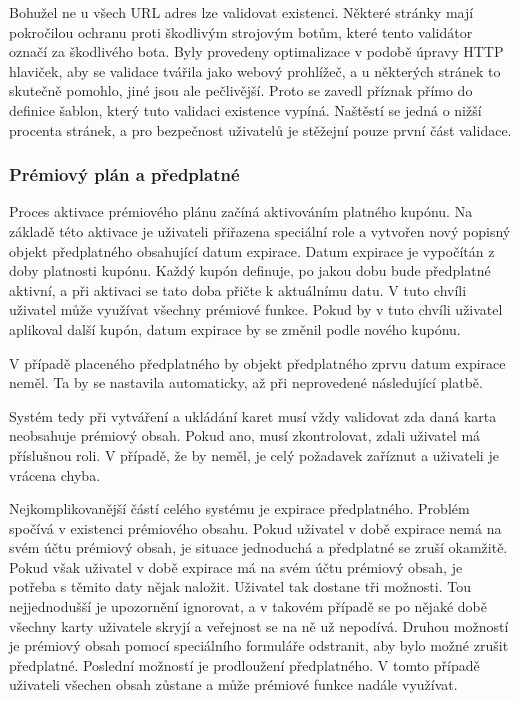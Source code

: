 
			Bohužel ne u všech \ac{URL} adres lze validovat existenci.
			Některé stránky mají pokročilou ochranu proti škodlivým strojovým botům, které tento validátor označí za
			škodlivého bota.
			Byly provedeny optimalizace v podobě úpravy \ac{HTTP} hlaviček, aby se validace tvářila jako webový prohlížeč,
			a u některých stránek to skutečně pomohlo, jiné jsou ale pečlivější.
			Proto se zavedl příznak přímo do definice šablon, který tuto validaci existence vypíná.
			Naštěstí se jedná o nižší procenta stránek, a pro bezpečnost uživatelů je stěžejní pouze první část validace.

		\subsubsection{Prémiový plán a předplatné}

		Proces aktivace prémiového plánu začíná aktivováním platného kupónu.
		Na základě této aktivace je uživateli přiřazena speciální role a vytvořen nový popisný objekt předplatného
		obsahující datum expirace.
		Datum expirace je vypočítán z doby platnosti kupónu.
		Každý kupón definuje, po jakou dobu bude předplatné aktivní, a při aktivaci se tato doba přičte k aktuálnímu datu.
		V tuto chvíli uživatel může využívat všechny prémiové funkce.
		Pokud by v tuto chvíli uživatel aplikoval další kupón, datum expirace by se změnil podle nového kupónu.

		V případě placeného předplatného by objekt předplatného zprvu datum expirace neměl.
		Ta by se nastavila automaticky, až při neprovedené následující platbě.

		Systém tedy při vytváření a ukládání karet musí vždy validovat zda daná karta neobsahuje prémiový obsah.
		Pokud ano, musí zkontrolovat, zdali uživatel má příslušnou roli.
		V případě, že by neměl, je celý požadavek zaříznut a uživateli je vrácena chyba.

		Nejkomplikovanější částí celého systému je expirace předplatného.
		Problém spočívá v existenci prémiového obsahu.
		Pokud uživatel v době expirace nemá na svém účtu prémiový obsah, je situace jednoduchá a předplatné se zruší okamžitě.
		Pokud však uživatel v době expirace má na svém účtu prémiový obsah, je potřeba s těmito daty nějak naložit.
		Uživatel tak dostane tři možnosti.
		Tou nejjednodušší je upozornění ignorovat, a v takovém případě se po nějaké době všechny karty uživatele skryjí
		a veřejnost se na ně už nepodívá.
		Druhou možností je prémiový obsah pomocí speciálního formuláře odstranit, aby bylo možné zrušit předplatné.
		Poslední možností je prodloužení předplatného.
		V tomto případě uživateli všechen obsah zůstane a může prémiové funkce nadále využívat.


